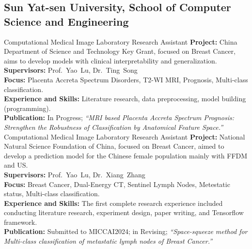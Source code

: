 \documentclass[11pt,a4paper, final]{moderncv}
\newcommand{\spacesubsection}{\vspace{0.2cm}}
\begin{document}
	\subsection{\textbf{Sun Yat-sen University, School of Computer Science and Engineering}}
		{Computational Medical Image Laboratory}
		{}
		{}{Research Assistant}
		{\fontsize{11pt}{14} \selectfont 
		\textbf{Project: }
		China Department of Science and Technology Key Grant, focused on Breast Cancer, 
		aims to develop models with clinical interpretability and generalization.\\
		\textbf{Supervisors: }
		Prof.~Yao~Lu, Dr.~Ting~Song
		\\
		\textbf{Focus: }
		Placenta Accreta Spectrum Disorders, T2-WI MRI, Prognosis, Multi-class classification.
		\\
		\textbf{Experience and Skills: }
		Literature research, data preprocessing, model building (programming).
		\\
		\textbf{Publication: }
		In Progress; 
		\emph{“MRI based Placenta Accreta Spectrum Prognosis: Strengthen the Robustness of Classification by Anatomical Feature Space.”}
		}
		{Computational Medical Image Laboratory}
		{}
		{}{Research Assistant}
		{\fontsize{11pt}{14} \selectfont 
		\textbf{Project: }
		National Natural Science Foundation of China, 
		focused on Breast Cancer, 
		aimed to develop a prediction model for the Chinese female population mainly with FFDM and US.\\
		\textbf{Supervisors: }
		Prof.~Yao~Lu, Dr.~Xiang~Zhang\\
		\textbf{Focus: }
		Breast Cancer, Dual-Energy CT, Sentinel Lymph Nodes, Metestatic status, Multi-class classification.\\
		\textbf{Experience and Skills: }
		The first complete research experience included conducting literature research, 
		experiment design, paper writing, and Tensorflow framework.\\
		\textbf{Publication: }
		Submitted to MICCAI2024; in Revising; 
		\emph{“Space-squeeze method for Multi-class classification of metastatic lymph nodes of Breast Cancer.”}
		}
\end{document}
